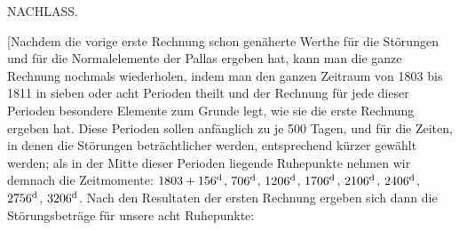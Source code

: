 \clearpage
{}
\begin{center}
{\Large NACHLASS.\par}
\par
\medskip
[1810 DECEMBER.]\par
\bigskip
[1.]
\end{center}
\begingroup
\newcommand{\IVoneSum}[2][3.1pt]{\raisebox{-#1}[0pt][0pt]{\(#2\)}}
\newcommand{\IVoneMarkedComma}{\mathord{\text{\rlap{\kern.15em\raisebox{1.15ex}{\rule{.18em}{.25pt}}},\kern.25em}}}
\newcommand{\IVoneAboveMinus}{\text{\rlap{\kern.02em\raisebox{.95ex}{\tikz[baseline=0pt,x=1em,y=1ex]{\draw[line width=.15pt](0,.15) .. controls (.07,-.08) and (.16,-.10) .. (.24,0);}}}}}
\newcommand{\IVoneTrailingStroke}{\text{\kern.02em\raisebox{.5ex}{\rule{.22em}{.25pt}}}}
\noindent\hspace*{\parindent}[Nachdem die vorige erste Rechnung schon genäherte Werthe für die Störungen und für die Normalelemente der Pallas ergeben hat, kann man die ganze Rechnung nochmals wiederholen, indem man den ganzen Zeitraum von 1803 bis 1811 in sieben oder acht Perioden theilt und der Rechnung für jede dieser Perioden besondere Elemente zum Grunde legt, wie sie die erste Rechnung ergeben hat. Diese Perioden sollen anfänglich zu je 500 Tagen, und für die Zeiten, in denen die Störungen beträchtlicher werden, entsprechend kürzer gewählt werden; als in der Mitte dieser Perioden liegende Ruhepunkte nehmen wir demnach die Zeitmomente: \(1803+156^{\rm d}\), \(706^{\rm d}\), \(1206^{\rm d}\), \(1706^{\rm d}\), \(2106^{\rm d}\), \(2406^{\rm d}\), \(2756^{\rm d}\), \(3206^{\rm d}\). Nach den Resultaten der ersten Rechnung ergeben sich dann die Störungsbeträge für unsere acht Ruhepunkte:
